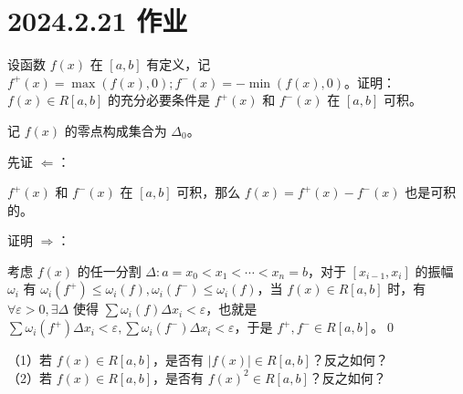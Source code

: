 \ifx\allfiles\undefined

\date{}
\author{尹锦润}

\maketitle
\fi

\section{2024.2.21 作业}

\begin{ques}
	设函数 $\displaystyle f( x)$ 在 $\displaystyle [ a,b]$ 有定义，记 $\displaystyle f^{+}( x) =\max( f( x) ,0) ;f^{-}( x) =-\min( f( x) ,0)$。证明：$\displaystyle f( x) \in R[ a,b]$ 的充分必要条件是 $\displaystyle f^{+}( x)$ 和 $\displaystyle f^{-}( x)$ 在 $\displaystyle [ a,b]$ 可积。
\end{ques}



记 $\displaystyle f( x)$ 的零点构成集合为 $\displaystyle \Delta _{0}$。

先证 $\displaystyle \Leftarrow $：

$\displaystyle f^{+}( x)$ 和 $\displaystyle f^{-}( x)$ 在 $\displaystyle [ a,b]$ 可积，那么 $\displaystyle f( x) =f^{+}( x) -f^{-}( x)$ 也是可积的。

证明 $\displaystyle \Rightarrow $：

考虑 $\displaystyle f( x)$ 的任一分割 $\displaystyle \Delta :a=x_{0} < x_{1} < \cdots < x_{n} =b$，对于 $\displaystyle [ x_{i-1} ,x_{i}]$ 的振幅 $\displaystyle \omega _{i}$ 有 $\displaystyle \omega _{i}\left( f^{+}\right) \leqslant \omega _{i}( f) ,\omega _{i}\left( f^{-}\right) \leqslant \omega _{i}( f)$，当 $\displaystyle f( x) \in R[ a,b]$ 时，有 $\displaystyle \forall \varepsilon  >0,\exists \Delta $ 使得 $\displaystyle \sum \omega _{i}( f) \Delta x_{i} < \varepsilon $，也就是$ $$\displaystyle \sum \omega _{i}\left( f^{+}\right) \Delta x_{i} < \varepsilon ,\sum \omega _{i}\left( f^{-}\right) \Delta x_{i} < \varepsilon $，于是 $\displaystyle f^{+} ,f^{-} \in R[ a,b]$。\qed 





\begin{ques}
	（1）若 $\displaystyle f( x) \in R[ a,b]$，是否有 $\displaystyle |f( x) |\in R[ a,b]$？反之如何？\\（2）若 $\displaystyle f( x) \in R[ a,b]$，是否有 $\displaystyle f( x)^{2} \in R[ a,b]$？反之如何？

\end{ques}



